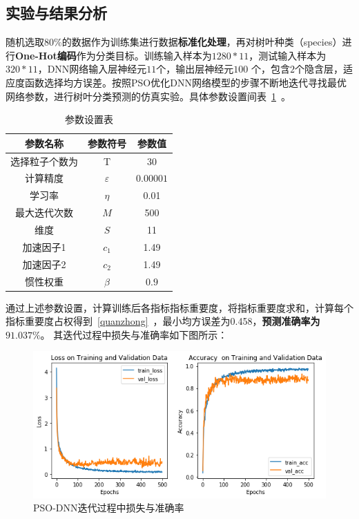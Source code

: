 \documentclass{whutmod}
\begin{document}
	\subsection{实验与结果分析}
	随机选取80\%的数据作为训练集进行数据\textbf{标准化处理}，再对树叶种类（species）进行\textbf{One-Hot编码}作为分类目标。训练输入样本为$1280*11$，测试输入样本为$320*11$，DNN网络输入层神经元$11$个，输出层神经元$100$ 个，包含$2$个隐含层，适应度函数选择均方误差。按照PSO优化DNN网络模型的步骤不断地迭代寻找最优网络参数，进行树叶分类预测的仿真实验。具体参数设置间表~\ref{canshu}~。
			\begin{table}[H]
		\centering		\caption{参数设置表}\label{canshu}
		\begin{tabular}{ccc}
			\toprule[2pt]
			\multicolumn{1}{m{4cm}}{\centering 参数名称}
			& \multicolumn{1}{m{3cm}}{\centering 参数符号}
			&\multicolumn{1}{m{3cm}}{\centering 参数值}
			\\
			\midrule[1pt]
			选择粒子个数为	 &  T &$30$ \\ 
			计算精度	 &  $\varepsilon$&$0.00001$  \\ 
			学习率	 &  $\eta $ &0.01 \\ 
			最大迭代次数	 &  $M$ &500\\ 
						维度	 &  $S$ &11 \\ 
									加速因子1	 &  $c_{1}$ &1.49\\ 
												加速因子2	 &  $c_{2}$ &1.49 \\ 
			惯性权重	 &  $\beta $ &$0.9$ \\ 
			\bottomrule[2pt]	
		\end{tabular}

	\end{table}
	
	通过上述参数设置，计算训练后各指标指标重要度，将指标重要度求和，计算每个指标重要度占权得到~\ref{quanzhong}~，最小均方误差为0.458，\textbf{预测准确率为$91.037\%$}。
	其迭代过程中损失与准确率如下图所示：
	\begin{figure}[H]
		\centering
		\includegraphics[width=\textwidth]{figures/x.png}
		\caption{PSO-DNN迭代过程中损失与准确率}\label{xxx}
	\end{figure}
\end{document}
